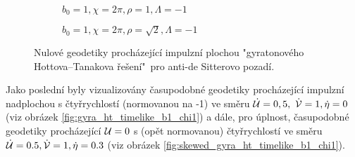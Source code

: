 \begin{figure}[H]
\begin{subfigure}[b]{0.48\textwidth}
        \caption{$b_0=1, \chi=2\pi, \rho=1, \Lambda = -1$}
    \end{subfigure}
    \hfill
    \begin{subfigure}[b]{0.48\textwidth}
        \caption{$b_0=1, \chi=2\pi, \rho=\sqrt{2}, \Lambda = -1$}
    \end{subfigure}
    \caption{Nulové geodetiky procházející impulzní plochou "gyratonového Hottova--Tanakova řešení"\ pro anti-de Sitterovo pozadí.}
    \label{fig:gyra_ht_null_b1_chi12_lmb-1}
\end{figure}

Jako poslední byly vizualizovány časupodobné geodetiky procházející impulzní nadplochou s čtyřrychlostí (normovanou na -1) ve směru $\dot {\mathcal{U}} = 0,5,~ \dot {\mathcal{V}} = 1, \dot \eta = 0$ (viz obrázek \ref{fig:gyra_ht_timelike_b1_chi1}) a dále, pro úplnost, časupodobné
geodetiky procházející $\mathcal{U} = 0$ s (opět normovanou) čtyřrychlostí ve směru $\dot {\mathcal{U}} = 0.5, \dot {\mathcal{V}} = 1, \dot \eta = 0.3$ (viz obrázek \ref{fig:skewed_gyra_ht_timelike_b1_chi1}).

